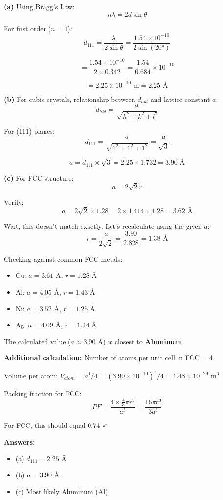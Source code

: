 \documentclass[12pt,a4paper]{article}
\begin{document}
\begin{solution}
\textbf{(a)} Using Bragg's Law:
$$n\lambda = 2d\sin\theta$$

For first order ($n = 1$):
$$d_{111} = \frac{\lambda}{2\sin\theta} = \frac{1.54 \times 10^{-10}}{2\sin(20°)}$$

$$= \frac{1.54 \times 10^{-10}}{2 \times 0.342} = \frac{1.54}{0.684} \times 10^{-10}$$

$$= 2.25 \times 10^{-10}\text{ m} = 2.25\text{ Å}$$

\textbf{(b)} For cubic crystals, relationship between $d_{hkl}$ and lattice constant $a$:
$$d_{hkl} = \frac{a}{\sqrt{h^2 + k^2 + l^2}}$$

For (111) planes:
$$d_{111} = \frac{a}{\sqrt{1^2 + 1^2 + 1^2}} = \frac{a}{\sqrt{3}}$$

$$a = d_{111} \times \sqrt{3} = 2.25 \times 1.732 = 3.90\text{ Å}$$

\textbf{(c)} For FCC structure:
$$a = 2\sqrt{2}r$$

Verify:
$$a = 2\sqrt{2} \times 1.28 = 2 \times 1.414 \times 1.28 = 3.62\text{ Å}$$

Wait, this doesn't match exactly. Let's recalculate using the given $a$:
$$r = \frac{a}{2\sqrt{2}} = \frac{3.90}{2.828} = 1.38\text{ Å}$$

Checking against common FCC metals:
\begin{itemize}
    \item Cu: $a = 3.61$ Å, $r = 1.28$ Å
    \item Al: $a = 4.05$ Å, $r = 1.43$ Å
    \item Ni: $a = 3.52$ Å, $r = 1.25$ Å
    \item Ag: $a = 4.09$ Å, $r = 1.44$ Å
\end{itemize}

The calculated value ($a \approx 3.90$ Å) is closest to \textbf{Aluminum}.

\textbf{Additional calculation:} Number of atoms per unit cell in FCC = 4

Volume per atom: $V_{atom} = a^3/4 = (3.90 \times 10^{-10})^3/4 = 1.48 \times 10^{-29}$ m$^3$

Packing fraction for FCC:
$$PF = \frac{4 \times \frac{4}{3}\pi r^3}{a^3} = \frac{16\pi r^3}{3a^3}$$

For FCC, this should equal 0.74 ✓

\textbf{Answers:}
\begin{itemize}
    \item (a) $d_{111} = 2.25$ Å
    \item (b) $a = 3.90$ Å
    \item (c) Most likely Aluminum (Al)
\end{itemize}
\end{solution}
\end{document}
